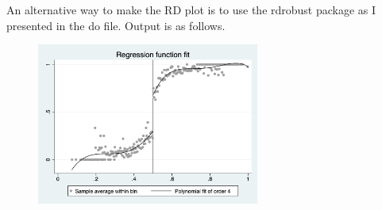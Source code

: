 \documentclass[12pt]{article}
\begin{document}
\begin{enumerate}[(a)]
\begin{figure}[H]
    \end{figure}
    An alternative way to make the RD plot is to use the rdrobust package as I presented in the do file. 
    Output is as follows.
    \begin{figure}[H]
        \centering
        \includegraphics[width=0.65\textwidth]{RD plot.jpg}
    \end{figure}
\end{enumerate}
\end{document}
